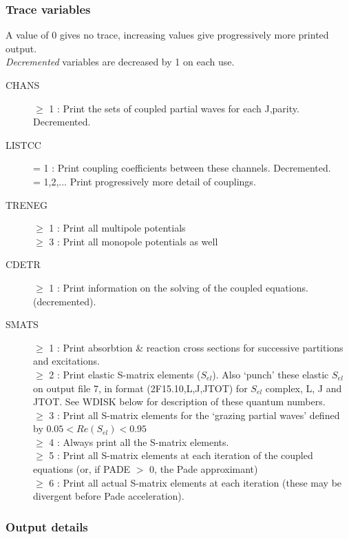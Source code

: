 \documentclass[11pt]{article}
\begin{document}
\subsubsection{Trace variables}
A value of 0 gives no trace,
increasing values give progressively more printed output.\\
{\em Decremented} variables are decreased by 1 on each use.

\begin{description}
\item[CHANS] $\geq$ 1 : Print the sets of coupled partial waves for each J,parity.
Decremented.

\item[LISTCC] = 1 : Print coupling coefficients between these channels. Decremented.
\\  = 1,2,... Print progressively more detail of couplings.
\item[TRENEG] $\geq$ 1 : Print all multipole potentials
\\  $\geq$ 3 : Print all monopole potentials as well
\item[CDETR]  $\geq$ 1 : Print information on the solving of the coupled equations.
(decremented).
\item[SMATS]  $\geq$ 1 : Print absorbtion \& reaction cross sections for successive
partitions and excitations.
\\  $\geq$ 2 : Print elastic S-matrix elements ($S_{el}$).
Also `punch' these elastic $S_{el}$ on output file 7,
in format (2F15.10,L,J,JTOT) for $S_{el}$ complex, L, J and JTOT.
See WDISK below for description of these quantum numbers.
\\  $\geq$ 3 : Print all S-matrix elements for the `grazing partial waves'
defined by $0.05 < Re(S_{el}) < 0.95$
\\  $\geq$ 4 : Always print all the S-matrix elements.
\\  $\geq$ 5 : Print all S-matrix elements at each iteration of the coupled
equations (or, if PADE  $>$ 0, the Pade approximant)
\\  $\geq$ 6 : Print all actual S-matrix elements at each iteration (these
may be divergent before Pade acceleration).


\end{description}

\subsubsection{Output details}
\end{document}
